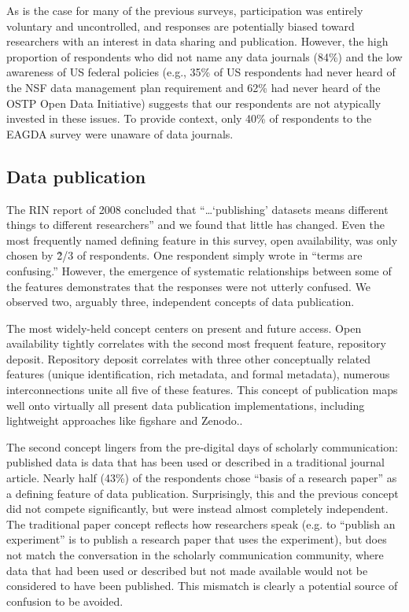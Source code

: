 \documentclass[10pt]{article}
\begin{document}
As is the case for many of the previous surveys, participation was entirely voluntary and uncontrolled, and responses are potentially biased toward researchers with an interest in data sharing and publication.
However, the high proportion of respondents who did not name any data journals (84\%) and the low awareness of US federal policies (e.g., 35\% of US respondents had never heard of the NSF data management plan requirement and 62\% had never heard of the OSTP Open Data Initiative) suggests that our respondents are not atypically invested in these issues.
To provide context, only 40\% of respondents to the EAGDA survey were unaware of data journals.

\subsection*{Data publication}

The RIN report of 2008 concluded that ``\ldots`publishing' datasets means different things to different researchers''\cite{swan_share_2008} and we found that little has changed.
Even the most frequently named defining feature in this survey, open availability, was only chosen by \~2/3 of respondents.
One respondent simply wrote in ``terms are confusing.''
However, the emergence of systematic relationships between some of the features demonstrates that the responses were not utterly confused.
We observed two, arguably three, independent concepts of data publication.

The most widely-held concept centers on present and future access.
Open availability tightly correlates with the second most frequent feature, repository deposit.
Repository deposit correlates with three other conceptually related features (unique identification, rich metadata, and formal metadata), numerous interconnections unite all five of these features.
This concept of publication maps well onto virtually all present data publication implementations, including lightweight approaches like figshare and Zenodo..

The second concept lingers from the pre-digital days of scholarly communication: published data is data that has been used or described in a traditional journal article. 
Nearly half (43\%) of the respondents chose ``basis of a research paper'' as a defining feature of data publication. 
Surprisingly, this and the previous concept did not compete significantly, but were instead almost completely independent.
The traditional paper concept reflects how researchers speak (e.g. to ``publish an experiment'' is to publish a research paper that uses the experiment), but does not match the conversation in the scholarly communication community, where data that had been used or described but not made available would not be considered to have been published.
This mismatch is clearly a potential source of confusion to be avoided.
\end{document}
